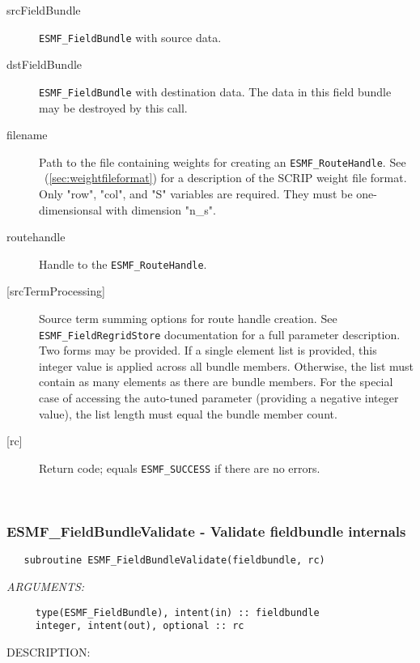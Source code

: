    \begin{description}
  
   \item [srcFieldBundle]
   {\tt ESMF\_FieldBundle} with source data.
  
   \item [dstFieldBundle]
   {\tt ESMF\_FieldBundle} with destination data. The data in this field
   bundle may be destroyed by this call.
  
   \item [filename]
   Path to the file containing weights for creating an {\tt ESMF\_RouteHandle}.
   See ~(\ref{sec:weightfileformat}) for a description of the SCRIP weight
   file format. Only "row", "col", and "S" variables are required. They
   must be one-dimensionsal with dimension "n\_s".
  
   \item [routehandle]
   Handle to the {\tt ESMF\_RouteHandle}.
  
   \item [{[srcTermProcessing]}]
   Source term summing options for route handle creation. See
   {\tt ESMF\_FieldRegridStore} documentation for a full parameter description.
   Two forms may be provided. If a single element list is provided, this
   integer value is applied across all bundle members. Otherwise, the list must
   contain as many elements as there are bundle members. For the special case
   of accessing the auto-tuned parameter (providing a negative integer value),
   the list length must equal the bundle member count.
  
   \item [{[rc]}]
   Return code; equals {\tt ESMF\_SUCCESS} if there are no errors.
  
   \end{description}
   
 
\mbox{}\hrulefill\ 
 
\subsubsection [ESMF\_FieldBundleValidate] {ESMF\_FieldBundleValidate - Validate fieldbundle internals}


\begin{verbatim}   subroutine ESMF_FieldBundleValidate(fieldbundle, rc)\end{verbatim}{\em ARGUMENTS:}
\begin{verbatim}     type(ESMF_FieldBundle), intent(in) :: fieldbundle
     integer, intent(out), optional :: rc\end{verbatim}
{\sf DESCRIPTION:\\ }


